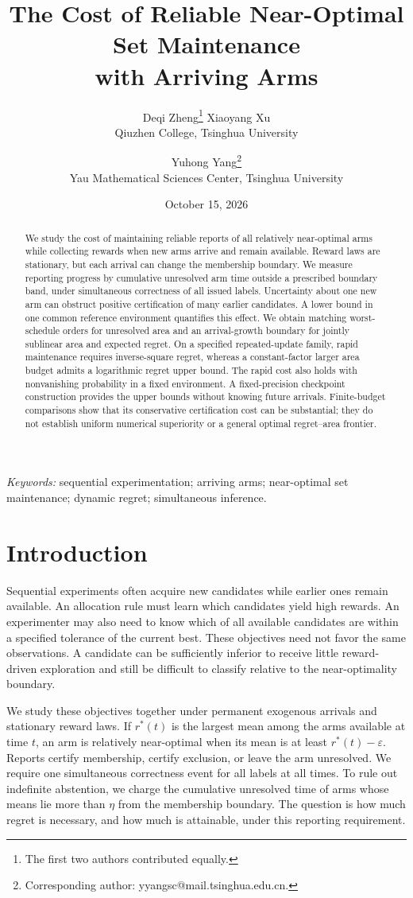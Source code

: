 \documentclass[11pt]{article}
\title{The Cost of Reliable Near-Optimal Set Maintenance\\with Arriving Arms}
\author{}
\author{Deqi Zheng\thanks{The first two authors contributed equally.} \quad
 Xiaoyang Xu\footnotemark[1] \\ Qiuzhen College, Tsinghua University
 \and Yuhong Yang\thanks{Corresponding author: yyangsc@mail.tsinghua.edu.cn.}\\
 Yau Mathematical Sciences Center, Tsinghua University}
\date{October 15, 2026}
\begin{document}
\maketitle

\begin{abstract}
We study the cost of maintaining reliable reports of all relatively
near-optimal arms while collecting rewards when new arms arrive and remain
available. Reward laws are stationary, but each arrival can change the
membership boundary. We measure reporting progress by cumulative unresolved
arm time outside a prescribed boundary band, under simultaneous correctness
of all issued labels. Uncertainty about one new arm can obstruct positive
certification of many earlier candidates. A lower bound in one common
reference environment quantifies this effect. We obtain matching
worst-schedule orders for unresolved area and an arrival-growth boundary
for jointly sublinear area and expected regret. On a specified
repeated-update family, rapid maintenance requires inverse-square regret,
whereas a constant-factor larger area budget admits a logarithmic regret
upper bound. The rapid cost also holds with nonvanishing probability in a
fixed environment. A fixed-precision checkpoint construction provides the
upper bounds without knowing future arrivals. Finite-budget comparisons
show that its conservative certification cost can be substantial; they
do not establish uniform numerical superiority or a general optimal
regret--area frontier.
\end{abstract}
\noindent\textit{Keywords:} sequential experimentation; arriving arms;
near-optimal set maintenance; dynamic regret; simultaneous inference.

\section{Introduction}
\label{sec:introduction}

Sequential experiments often acquire new candidates while earlier ones remain
available. An allocation rule must learn which candidates yield high rewards.
An experimenter may also need to know which of all available candidates are
within a specified tolerance of the current best. These objectives need not
favor the same observations. A candidate can be sufficiently inferior to
receive little reward-driven exploration and still be difficult to classify
relative to the near-optimality boundary.

We study these objectives together under permanent exogenous arrivals and
stationary reward laws. If $r^*(t)$ is the largest mean among the arms
available at time $t$, an arm is relatively near-optimal when its mean is at
least $r^*(t)-\varepsilon$. Reports certify membership, certify exclusion, or
leave the arm unresolved. We require one simultaneous correctness event for
all labels at all times. To rule out indefinite abstention, we charge the
cumulative unresolved time of arms whose means lie more than $\eta$ from
the membership boundary. The question is how much regret is necessary, and
how much is attainable, under this reporting requirement.
\end{document}
